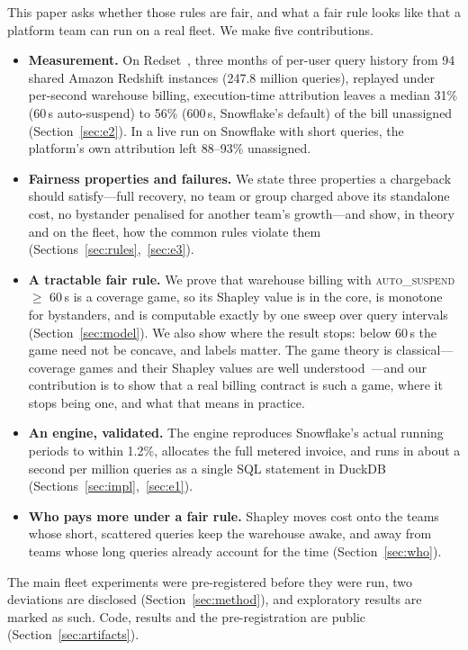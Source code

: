 \documentclass[sigconf]{acmart}
\newcommand{\autos}{\textsc{auto\_suspend}}
\begin{document}
This paper asks whether those rules are fair, and what a fair rule looks like that a platform team can run on a real fleet.
We make five contributions.
\begin{itemize}
\item \textbf{Measurement.} On Redset~\cite{redset}, three months of per-user query history from 94 shared Amazon Redshift
instances (247.8 million queries), replayed under per-second warehouse billing, execution-time attribution leaves a median
31\% (60\,s auto-suspend) to 56\% (600\,s, Snowflake's default) of the bill unassigned (Section~\ref{sec:e2}). In a live run
on Snowflake with short queries, the platform's own attribution left 88--93\% unassigned.
\item \textbf{Fairness properties and failures.} We state three properties a chargeback should satisfy---full recovery, no
team or group charged above its standalone cost, no bystander penalised for another team's growth---and show, in theory and
on the fleet, how the common rules violate them (Sections~\ref{sec:rules},~\ref{sec:e3}).
\item \textbf{A tractable fair rule.} We prove that warehouse billing with \autos{} $\ge$ 60\,s is a coverage game, so its
Shapley value is in the core, is monotone for bystanders, and is computable exactly by one sweep over query intervals
(Section~\ref{sec:model}). We also show where the result stops: below 60\,s the game need not be concave, and labels matter. The game theory is
classical---coverage games and their Shapley values are well understood~\cite{shapley71,littlechild73}---and our contribution
is to show that a real billing contract is such a game, where it stops being one, and what that means in practice.
\item \textbf{An engine, validated.} The engine reproduces Snowflake's actual running periods to within 1.2\%, allocates the
full metered invoice, and runs in about a second per million queries as a single SQL statement in DuckDB
(Sections~\ref{sec:impl},~\ref{sec:e1}).
\item \textbf{Who pays more under a fair rule.} Shapley moves cost onto the teams whose short, scattered queries keep the
warehouse awake, and away from teams whose long queries already account for the time (Section~\ref{sec:who}).
\end{itemize}
The main fleet experiments were pre-registered before they were run, two deviations are disclosed (Section~\ref{sec:method}),
and exploratory results are marked as such. Code, results and the pre-registration are public (Section~\ref{sec:artifacts}).
\end{document}
